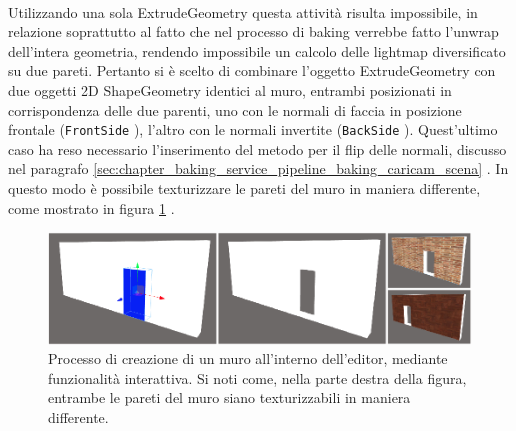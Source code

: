 \\
Utilizzando una sola ExtrudeGeometry questa attività risulta impossibile, in relazione soprattutto al fatto che nel processo di baking verrebbe fatto l’unwrap dell’intera geometria, rendendo impossibile un calcolo delle lightmap diversificato su due pareti.
Pertanto si è scelto di combinare l’oggetto ExtrudeGeometry con due oggetti 2D ShapeGeometry identici al muro, entrambi posizionati in corrispondenza delle due parenti, uno con le normali di faccia in posizione frontale (\texttt{FrontSide} ), l’altro con le normali invertite (\texttt{BackSide} ). Quest’ultimo caso ha reso necessario l’inserimento del metodo per il flip delle normali, discusso nel paragrafo \ref{sec:chapter_baking_service_pipeline_baking_caricam_scena} . In questo modo è possibile texturizzare le pareti del muro in maniera differente, come mostrato in figura \ref{fig:editor_3} .
\\
\begin{figure}[htb]
 \centering
 \includegraphics[width=1\linewidth]{images/chapter_creazione_scena/editor_3.png}\hfill
 \caption[Creazione muri]{Processo di creazione di un muro all'interno dell'editor, mediante funzionalità interattiva. Si noti come, nella parte destra della figura, entrambe le pareti del muro siano texturizzabili in maniera differente.}
 \label{fig:editor_3}
\end{figure}

